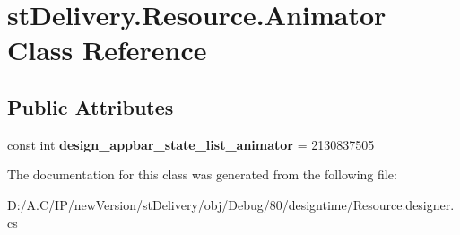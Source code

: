 \hypertarget{classst_delivery_1_1_resource_1_1_animator}{}\section{st\+Delivery.\+Resource.\+Animator Class Reference}
\label{classst_delivery_1_1_resource_1_1_animator}
\subsection*{Public Attributes}
\begin{DoxyCompactItemize}
\item 
\mbox{\label{classst_delivery_1_1_resource_1_1_animator_af63543eb19936b391a32cd86d6f247c2}} 
const int {\bfseries design\+\_\+appbar\+\_\+state\+\_\+list\+\_\+animator} = 2130837505
\end{DoxyCompactItemize}


The documentation for this class was generated from the following file\+:\begin{DoxyCompactItemize}
\item 
D\+:/\+A.\+C/\+I\+P/new\+Version/st\+Delivery/obj/\+Debug/80/designtime/Resource.\+designer.\+cs\end{DoxyCompactItemize}
